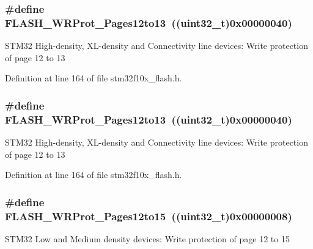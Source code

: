 \subsubsection[{\texorpdfstring{F\+L\+A\+S\+H\+\_\+\+W\+R\+Prot\+\_\+\+Pages12to13}{FLASH_WRProt_Pages12to13}}]{\setlength{\rightskip}{0pt plus 5cm}\#define F\+L\+A\+S\+H\+\_\+\+W\+R\+Prot\+\_\+\+Pages12to13~(({\bf uint32\+\_\+t})0x00000040)}\hypertarget{group___option___bytes___write___protection_ga571e248a64ef9bf7f99ed85831aacaaa}{}\label{group___option___bytes___write___protection_ga571e248a64ef9bf7f99ed85831aacaaa}
S\+T\+M32 High-\/density, X\+L-\/density and Connectivity line devices\+: Write protection of page 12 to 13 

Definition at line 164 of file stm32f10x\+\_\+flash.\+h.

\subsubsection[{\texorpdfstring{F\+L\+A\+S\+H\+\_\+\+W\+R\+Prot\+\_\+\+Pages12to13}{FLASH_WRProt_Pages12to13}}]{\setlength{\rightskip}{0pt plus 5cm}\#define F\+L\+A\+S\+H\+\_\+\+W\+R\+Prot\+\_\+\+Pages12to13~(({\bf uint32\+\_\+t})0x00000040)}\hypertarget{group___option___bytes___write___protection_ga571e248a64ef9bf7f99ed85831aacaaa}{}\label{group___option___bytes___write___protection_ga571e248a64ef9bf7f99ed85831aacaaa}
S\+T\+M32 High-\/density, X\+L-\/density and Connectivity line devices\+: Write protection of page 12 to 13 

Definition at line 164 of file stm32f10x\+\_\+flash.\+h.

\subsubsection[{\texorpdfstring{F\+L\+A\+S\+H\+\_\+\+W\+R\+Prot\+\_\+\+Pages12to15}{FLASH_WRProt_Pages12to15}}]{\setlength{\rightskip}{0pt plus 5cm}\#define F\+L\+A\+S\+H\+\_\+\+W\+R\+Prot\+\_\+\+Pages12to15~(({\bf uint32\+\_\+t})0x00000008)}\hypertarget{group___option___bytes___write___protection_gaa02b9439f75982e2e1c14f8af9a8c091}{}\label{group___option___bytes___write___protection_gaa02b9439f75982e2e1c14f8af9a8c091}
S\+T\+M32 Low and Medium density devices\+: Write protection of page 12 to 15 

